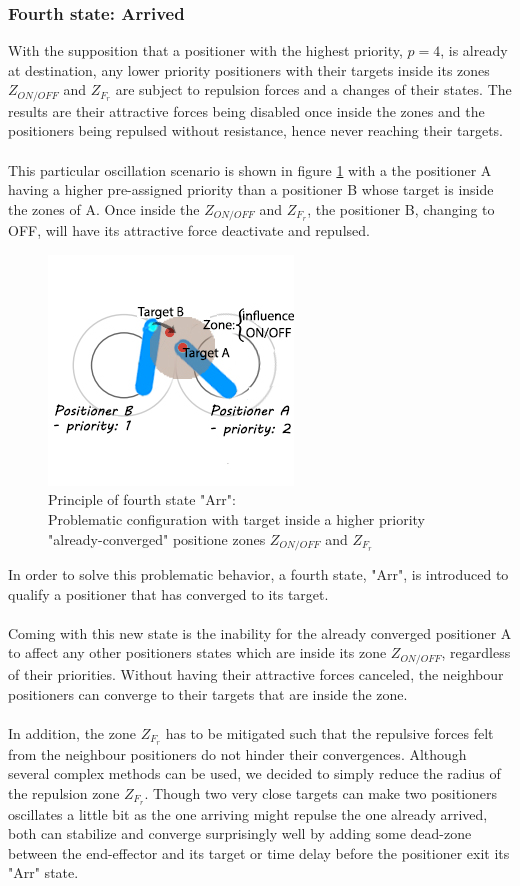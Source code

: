\documentclass[]{spie}  %
\begin{document}
	\subsubsection{Fourth state: Arrived}
	\label{sub_chap_fourth_state}
	With the supposition that a positioner with the highest priority, $p = 4$, is already at destination, any lower priority positioners with their targets inside its zones $Z_{ON/OFF}$ and $Z_{F_{r}}$  are subject to repulsion forces and a changes of their states. The results are their attractive forces being disabled once inside the zones and the positioners being repulsed without resistance, hence never reaching their targets.\\
	\\
	This particular oscillation scenario is shown in figure \ref{fourth_state} with a the positioner A having a higher pre-assigned priority than a positioner B whose target is inside the zones of A. Once inside the $Z_{ON/OFF}$ and $Z_{F_{r}}$, the positioner B, changing to OFF, will have its attractive force deactivate and repulsed.
	\begin{figure}[H]
		\centering
		\includegraphics[scale=0.64]{images/fourth_state.jpg}
		\caption{\centering	Principle of fourth state "Arr":\\
		Problematic configuration with target inside a higher priority "already-converged" positione zones $Z_{ON/OFF}$ and $Z_{F_{r}}$ }
		\label{fourth_state}
	\end{figure}
	In order to solve this problematic behavior, a fourth state, "Arr", is introduced to qualify a positioner that has converged to its target. \\\\
	Coming with this new state is the inability for the already converged positioner A to affect any other positioners states which are inside its zone $Z_{ON/OFF}$, regardless of their priorities.
	Without having their attractive forces canceled, the neighbour positioners can converge to their targets that are inside the zone.\\\\
	In addition, the zone $Z_{F_{r}}$ has to be mitigated such that the repulsive forces felt from the neighbour positioners do not hinder their convergences. Although several complex methods can be used, we decided to simply reduce the radius of the repulsion zone $Z_{F_{r}}$. Though two very close targets can make two positioners oscillates a little bit as the one arriving might repulse the one already arrived, both can stabilize and converge surprisingly well by adding some dead-zone between the end-effector and its target or time delay before the positioner exit its "Arr" state.  
	
\end{document}
